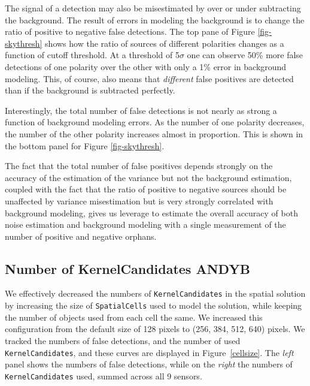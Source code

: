 \documentclass[prd, nofootinbib, floatfix, 11pt,tightenlines,times]{article}
\begin{document}

The signal of a detection may also be misestimated by over or under subtracting the background.  
The result of errors in modeling the background is to change the ratio of positive to negative
false detections.  The top pane of Figure \ref{fig-skythresh} shows how the ratio of sources of 
different polarities changes as a function of cutoff threshold.  At a threshold of 5$\sigma$
one can observe 50\% more false detections of one polarity over the other with only a 1\% error in background
modeling.  This, of course, also means that {\it different} false positives are detected than if the
background is subtracted perfectly.

Interestingly, the total number of false detections is not nearly as strong a function of background 
modeling errors.  As the number of one polarity decreases, the number of the other polarity increases
almost in proportion.  This is shown in the bottom panel for Figure \ref{fig-skythresh}.

The fact that the total number of false positives depends strongly on the accuracy of the estimation
of the variance but not the background estimation, coupled with the fact that the ratio of positive to 
negative sources should be unaffected by variance misestimation but is very strongly correlated with 
background modeling, gives us leverage to estimate the overall accuracy of both noise estimation and 
background modeling with a single measurement of the number of positive and negative orphans.



\subsection{Number of KernelCandidates {\bf ANDYB}}

We effectively decreased the numbers of {\tt KernelCandidates} in the
spatial solution by increasing the size of {\tt SpatialCells} used to
model the solution, while keeping the number of objects used from each
cell the same.  We increased this configuration from the default size
of 128 pixels to (256, 384, 512, 640) pixels.  We tracked the numbers
of false detections, and the number of used {\tt KernelCandidates},
and these curves are displayed in Figure~\ref{cellsize}.  The {\it
  left} panel shows the numbers of false detections, while on the {\it
  right} the numbers of {\tt KernelCandidates} used, summed across all
9 sensors.
\end{document}
